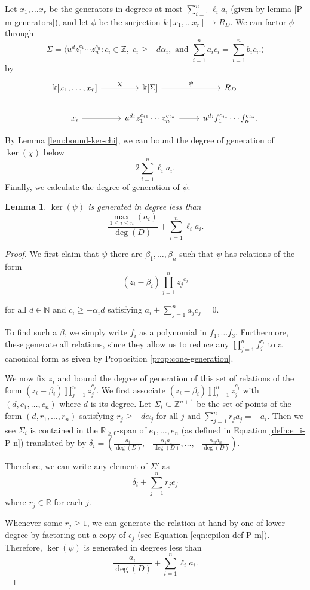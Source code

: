 \documentclass{amsart}
\theoremstyle{plain}
\newtheorem{lem}[thm]{Lemma}
\theoremstyle{definition}
\theoremstyle{remark}
\numberwithin{equation}{section}
\newcommand\bk{{\Bbbk}}
\newcommand\bida{a}
\newcommand\bidb{b}
\begin{document}
Let $x_1, \ldots x_r$ be the generators in degrees at most $\sum_{i=1}^n \ell_i \bida_i$ (given by lemma \ref{P-m-generators}), and let $\phi$ be the surjection $k[x_1, \ldots x_r] \to R_D$.  We can factor $\phi$ through 
\[
	\Sigma =  \langle u^d z_1^{c_1} \cdots z_n^{c_n} : c_i \in \mathbb{Z}, \; c_i \geq -d \alpha_i, \mbox{ and }\sum_{i=1}^{n} \bida_i c_i = \sum_{i=1}^{n} \bidb_i c_i. \rangle 
\]
by
\[
\begin{tikzcd}
\bk[x_1,\ldots, x_r] \ar {r}{\chi} & \bk[\Sigma] \ar {r}{\psi} & R_D \\
x_i \ar r & u^{d_i}z_1^{c_{i1}} \cdots z_n^{c_{in}} \ar r & u^{d_i}f_1^{c_{i1}} \cdots f_n^{c_{in}}.
\end{tikzcd}
\]

By Lemma \ref{lem:bound-ker-chi}, we can bound the degree of generation of $\ker(\chi)$ below
\[
	2 \sum_{i=1}^n \ell_i a_i.
\]
Finally, we calculate the degree of generation of $\psi$:

\begin{lem}\label{P-m-relations-psi}
$\ker(\psi)$ is generated in degree less than
\[
	\frac{\max_{1\le i \le n}(\bida_i)}{\deg(D)} +  \sum_{i=1}^n \ell_i a_i.
\]
\end{lem}
\begin{proof}
We first claim that $\psi$ there are $\beta_1, \ldots, \beta_n$ such that $\psi$ has relations of the form
\begin{equation}\label{eqn:relations-psi}
	(z_i - \beta_i)\prod_{j=1}^n {z_j}^{c_{j}}
\end{equation}

\noindent
for all $d \in \mathbb{N}$ and $c_i \ge -\alpha_i d$ satisfying $\bida_i + \sum_{j = 1}
^n \bida_j c_j = 0$.

To find such a $\beta$, we simply write $f_i$ as a 
polynomial in $f_1, \ldots f_3$. Furthermore, these
generate all relations, since they allow us to reduce any $\prod_{j =
1}^n f_j^{r_i}$ to a canonical form as given by Proposition \ref{prop:cone-generation}.

We now fix $z_i$ and bound the degree of generation of this set of relations of the form $(z_i - \beta_i) \prod_{j=1}^n z_j^{c_j}$.  We first associate $(z_i - \beta_i)\prod_{j=1}^n z_j^{c_j}$ with $(d, c_1, \ldots, c_n)$ where $d$ is its degree.  Let $\Sigma_i \subseteq \mathbb{Z}^{n+1}$ be the set of points of the form $(d, r_1, \ldots, r_n)$ satisfying $r_j \ge -d \alpha_j$ for all $j$ and $\sum_{j=1}^n r_j a_j = -a_i$.  
Then we see $\Sigma_i$ is contained in the $\mathbb{R}_{\ge 0}$-span of $e_1, \ldots, e_n$ (as defined in Equation \ref{defn:e_i-P-n}) translated by by $\delta_i = (\frac{a_i}{\deg(D)}, -\frac{\alpha_1 a_1}{\deg(D)}, \ldots, - \frac{\alpha_n a_n}{\deg(D)})$.

Therefore, we can write any element of $\Sigma'$ as
\[
	\delta_i + \sum_{j=1}^n r_j e_j
\]
where $r_j \in \mathbb{R}$ for each $j$.

Whenever some $r_j \ge 1$, we can generate the relation at hand by one of lower degree by factoring out a copy of $\epsilon_j$ (see Equation \ref{eqn:epilon-def-P-m}).  Therefore, $\ker(\psi)$ is generated in degrees less than
\[
	\frac{\bida_i}{\deg(D)} + \sum_{i=1}^n \ell_i a_i.
\]
\end{proof}
\end{document}
